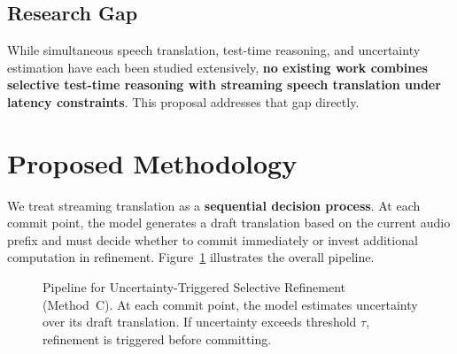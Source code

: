 \subsection{Research Gap}

While simultaneous speech translation, test-time reasoning, and uncertainty estimation have each been studied extensively, \textbf{no existing work combines selective test-time reasoning with streaming speech translation under latency constraints}. This proposal addresses that gap directly.


\section{Proposed Methodology}

We treat streaming translation as a \textbf{sequential decision process}. At each commit point, the model generates a draft translation based on the current audio prefix and must decide whether to commit immediately or invest additional computation in refinement. Figure~\ref{fig:pipeline} illustrates the overall pipeline.

\begin{figure}[ht]
\centering
{}
\caption{Pipeline for Uncertainty-Triggered Selective Refinement (Method~C). At each commit point, the model estimates uncertainty over its draft translation. If uncertainty exceeds threshold $\tau$, refinement is triggered before committing.}
\label{fig:pipeline}
\end{figure}

